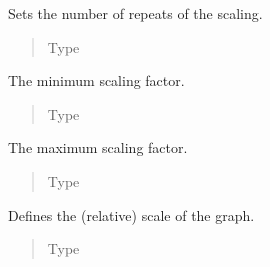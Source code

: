 \documentclass[letterpaper,10pt,english]{sphinxmanual}
\begin{document}
\begin{fulllineitems}
\begin{fulllineitems}
\begin{quote}
\begin{description}
\end{description}\end{quote}

\end{fulllineitems}



\begin{fulllineitems}
Sets the number of repeats of the scaling.
\begin{quote}\begin{description}
\item[{Type}] \leavevmode
{}

\end{description}\end{quote}

\end{fulllineitems}



\begin{fulllineitems}
The minimum scaling factor.
\begin{quote}\begin{description}
\item[{Type}] \leavevmode
{}

\end{description}\end{quote}

\end{fulllineitems}



\begin{fulllineitems}
The maximum scaling factor.
\begin{quote}\begin{description}
\item[{Type}] \leavevmode
{}

\end{description}\end{quote}

\end{fulllineitems}



\begin{fulllineitems}
Defines the (relative) scale of the graph.
\begin{quote}\begin{description}
\item[{Type}] \leavevmode
{\hyperref[\detokenize{documentation:tmap.ScalingType}]{}}


\end{description}
\end{quote}
\end{fulllineitems}
\end{fulllineitems}
\end{document}
